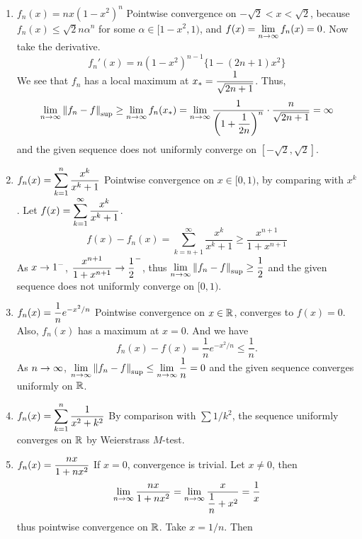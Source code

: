 \begin{enumerate}
	\item \(f_n(x) = nx(1-x^2)^n\) \newline
	      Pointwise convergence on \(-\sqrt{2} < x < \sqrt{2}\), because \(f_n(x) \leq \sqrt{2}n\alpha^n\) for some \(\alpha \in [1-x^2, 1)\), and \(f(x) = \displaystyle \lim_{n \rightarrow \infty} f_n(x) = 0\). Now take the derivative.
	      \[
		      f_n'(x) = n(1-x^2)^{n-1}\{1 - (2n+1)x^2\}
	      \]
	      We see that \(f_n\) has a local maximum at \(\displaystyle x_\ast = \frac{1}{\sqrt{2n+1}}\). Thus,
	      \[
		      \lim_{n\rightarrow\infty} \left\lVert f_n-f\right\rVert_{\sup} \geq \lim_{n \rightarrow \infty} f_n(x_\ast) = \lim_{n \rightarrow \infty} \frac{1}{\left(1 + \dfrac{1}{2n}\right)^n}\cdot \frac{n}{\sqrt{2n+1}} = \infty
	      \]
	      and the given sequence does not uniformly converge on \([-\sqrt{2}, \sqrt{2}]\).
	\item \(f_n(x) = \displaystyle \sum_{k=1}^{n} \frac{x^k}{x^k + 1}\) \newline
	      Pointwise convergence on \(x\in [0, 1)\), by comparing with \(x^k\). Let \(f(x) = \displaystyle \sum_{k=1}^\infty \frac{x^k}{x^k+1}\).
	      \[
		      f(x) - f_n(x) = \sum_{k=n+1}^\infty \frac{x^k}{x^k+1}\geq \frac{x^{n+1}}{1+x^{n+1}}
	      \]
	      As \(x \rightarrow 1^-\), \(\displaystyle \frac{x^{n+1}}{1+x^{n+1}}\rightarrow \frac{1}{2}^-\), thus \(\displaystyle \lim_{n\rightarrow\infty} \left\lVert f_n-f\right\rVert_{\sup} \geq \frac{1}{2}\) and the given sequence does not uniformly converge on \([0, 1)\).
	\item \(f_n(x) = \displaystyle \frac{1}{n}e^{-x^2/n}\) \newline
	      Pointwise convergence on \(x\in \mathbb{R}\), converges to \(f(x) = 0\). Also, \(f_n(x)\) has a maximum at \(x = 0\). And we have
	      \[
		      f_n(x) - f(x) = \frac{1}{n}e^{-x^2/n} \leq \frac{1}{n}.
	      \]
	      As \(n\rightarrow \infty\), \(\displaystyle \lim_{n \rightarrow \infty} \left\lVert f_n-f\right\rVert_{\sup} \leq \lim_{n \rightarrow \infty}\frac{1}{n} = 0\) and the given sequence converges uniformly on \(\mathbb{R}\).
	\item \(\displaystyle f_n(x) = \sum_{k=1}^n \frac{1}{x^2+k^2}\) \newline
	      By comparison with \(\sum 1/k^2\), the sequence uniformly converges on \(\mathbb{R}\) by Weierstrass \(M\)-test.
	\item \(\displaystyle f_n(x) = \frac{nx}{1+nx^2}\) \newline
	      If \(x = 0\), convergence is trivial. Let \(x \neq 0\), then
	      \[
		      \lim_{n \rightarrow \infty} \frac{nx}{1+nx^2} = \lim_{n \rightarrow \infty} \frac{x}{\dfrac{1}{n}+x^2} = \frac{1}{x}
	      \]
	      thus pointwise convergence on \(\mathbb{R}\). Take \(x = 1/n\). Then

\end{enumerate}
